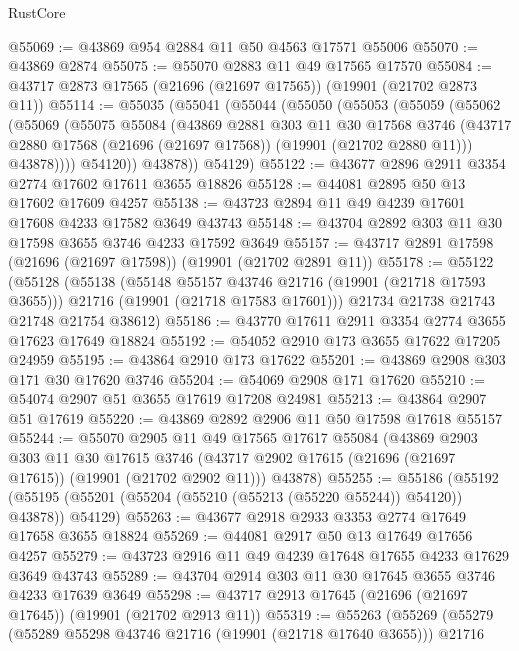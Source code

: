 \begin{lexlean}{RustCore}
\begin{coremodule}
@55069 := @43869 @954 @2884 @11 @50 @4563 @17571 @55006
@55070 := @43869 @2874
@55075 := @55070 @2883 @11 @49 @17565 @17570
@55084 := @43717 @2873 @17565 (@21696 (@21697 @17565)) (@19901 (@21702 @2873 @11))
@55114 := @55035
    (@55041
      (@55044
        (@55050
          (@55053
            (@55059
              (@55062
                (@55069
                  (@55075
                    @55084
                    (@43869
                      @2881
                      @303
                      @11
                      @30
                      @17568
                      @3746
                      (@43717 @2880 @17568 (@21696 (@21697 @17568)) (@19901 (@21702 @2880 @11)))
                      @43878))))
              @54120))
          @43878))
      @54129)
@55122 := @43677 @2896 @2911 @3354 @2774 @17602 @17611 @3655 @18826
@55128 := @44081 @2895 @50 @13 @17602 @17609 @4257
@55138 := @43723 @2894 @11 @49 @4239 @17601 @17608 @4233 @17582 @3649 @43743
@55148 := @43704 @2892 @303 @11 @30 @17598 @3655 @3746 @4233 @17592 @3649
@55157 := @43717 @2891 @17598 (@21696 (@21697 @17598)) (@19901 (@21702 @2891 @11))
@55178 := @55122
    (@55128
      (@55138
        (@55148 @55157 @43746 @21716 (@19901 (@21718 @17593 @3655)))
        @21716
        (@19901 (@21718 @17583 @17601)))
      @21734
      @21738
      @21743
      @21748
      @21754
      @38612)
@55186 := @43770 @17611 @2911 @3354 @2774 @3655 @17623 @17649 @18824
@55192 := @54052 @2910 @173 @3655 @17622 @17205 @24959
@55195 := @43864 @2910 @173 @17622
@55201 := @43869 @2908 @303 @171 @30 @17620 @3746
@55204 := @54069 @2908 @171 @17620
@55210 := @54074 @2907 @51 @3655 @17619 @17208 @24981
@55213 := @43864 @2907 @51 @17619
@55220 := @43869 @2892 @2906 @11 @50 @17598 @17618 @55157
@55244 := @55070
    @2905
    @11
    @49
    @17565
    @17617
    @55084
    (@43869
      @2903
      @303
      @11
      @30
      @17615
      @3746
      (@43717 @2902 @17615 (@21696 (@21697 @17615)) (@19901 (@21702 @2902 @11)))
      @43878)
@55255 := @55186
    (@55192 (@55195 (@55201 (@55204 (@55210 (@55213 (@55220 @55244)) @54120)) @43878)) @54129)
@55263 := @43677 @2918 @2933 @3353 @2774 @17649 @17658 @3655 @18824
@55269 := @44081 @2917 @50 @13 @17649 @17656 @4257
@55279 := @43723 @2916 @11 @49 @4239 @17648 @17655 @4233 @17629 @3649 @43743
@55289 := @43704 @2914 @303 @11 @30 @17645 @3655 @3746 @4233 @17639 @3649
@55298 := @43717 @2913 @17645 (@21696 (@21697 @17645)) (@19901 (@21702 @2913 @11))
@55319 := @55263
    (@55269
      (@55279
        (@55289 @55298 @43746 @21716 (@19901 (@21718 @17640 @3655)))
        @21716

\end{coremodule}
\end{lexlean}
